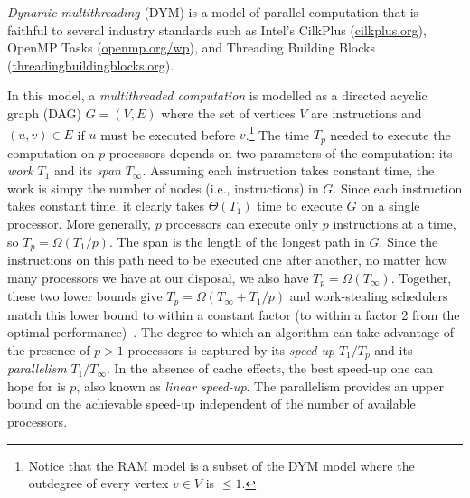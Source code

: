 {\em Dynamic multithreading} (DYM) \cite[Chapter~27]{Cormen2009} is a
model of parallel computation that is faithful to several industry standards
such as Intel's CilkPlus (\url{cilkplus.org}), OpenMP Tasks
(\url{openmp.org/wp}), and Threading Building
Blocks (\url{threadingbuildingblocks.org}).

In this model, a {\em multithreaded computation} is modelled as a directed
acyclic graph (DAG) $G=(V,E)$ where the set of vertices $V$ are instructions
and $(u,v) \in E$ if $u$ must be executed before $v$.\footnote{Notice that the
  RAM model is a subset of the DYM model where the outdegree of every
  vertex $v \in V$ is $\leq 1$.}
The time $T_p$ needed to execute the computation on $p$ processors depends on
two parameters of the computation: its {\em work} $T_1$ and its {\em span}
$T_\infty$.
Assuming each instruction takes constant time, the work is simpy the number of
nodes (i.e., instructions) in $G$.
Since each instruction takes constant time, it clearly takes $\Theta(T_1)$ time
to execute $G$ on a single processor.
More generally, $p$ processors can execute only $p$ instructions at a time, so
$T_p = \Omega(T_1/p)$.
The span is the length of the longest path in $G$.
Since the instructions on this path need to be executed one after another, no
matter how many processors we have at our disposal, we also have
$T_p = \Omega(T_\infty)$.
Together, these two lower bounds give $T_p = \Omega(T_\infty + T_1/p)$ and
work-stealing schedulers match this lower bound to within a constant factor
(to within a factor 2 from the optimal
performance)~\cite{Blumofe:1999:SMC:324133.324234}.
The degree to which an algorithm can take advantage of the presence of $p > 1$
processors is captured by its {\em speed-up} $T_1 / T_p$ and its
{\em parallelism} $T_1 / T_\infty$.
In the absence of cache effects, the best speed-up one can hope for is $p$,
also known as {\em linear speed-up}.
The parallelism provides an upper bound on the achievable speed-up independent
of the number of available processors.

